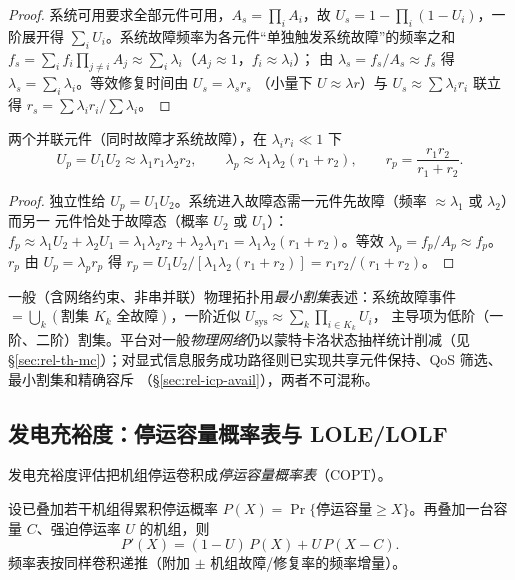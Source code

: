 \begin{proof}
系统可用要求全部元件可用，$A_s=\prod_iA_i$，故 $U_s=1-\prod_i(1-U_i)$，一阶展开得
$\sum_iU_i$。系统故障频率为各元件“单独触发系统故障”的频率之和
$f_s=\sum_i f_i\prod_{j\ne i}A_j\approx\sum_i\lambda_i$（$A_j\approx1$，$f_i\approx\lambda_i$）；
由 $\lambda_s=f_s/A_s\approx f_s$ 得 $\lambda_s=\sum_i\lambda_i$。等效修复时间由 $U_s=\lambda_s r_s$
（小量下 $U\approx\lambda r$）与 $U_s\approx\sum\lambda_ir_i$ 联立得 $r_s=\sum\lambda_ir_i/\sum\lambda_i$。
\end{proof}

\begin{proposition}[双元件并联合并]\label{prop:rel-th-parallel}
两个并联元件（同时故障才系统故障），在 $\lambda_ir_i\ll1$ 下
\begin{equation}
 U_p=U_1U_2\approx\lambda_1r_1\lambda_2r_2,\qquad
 \lambda_p\approx\lambda_1\lambda_2(r_1+r_2),\qquad
 r_p=\frac{r_1r_2}{r_1+r_2}.
 \label{eq:rel-th-parallel}
\end{equation}
\end{proposition}

\begin{proof}
独立性给 $U_p=U_1U_2$。系统进入故障态需一元件先故障（频率 $\approx\lambda_1$ 或 $\lambda_2$）而另一
元件恰处于故障态（概率 $U_2$ 或 $U_1$）：$f_p\approx\lambda_1U_2+\lambda_2U_1
=\lambda_1\lambda_2 r_2+\lambda_2\lambda_1 r_1=\lambda_1\lambda_2(r_1+r_2)$。等效
$\lambda_p=f_p/A_p\approx f_p$。$r_p$ 由 $U_p=\lambda_p r_p$ 得
$r_p=U_1U_2/[\lambda_1\lambda_2(r_1+r_2)]=r_1r_2/(r_1+r_2)$。
\end{proof}

一般（含网络约束、非串并联）物理拓扑用\emph{最小割集}表述：系统故障事件
$=\bigcup_k(\text{割集 }K_k\text{ 全故障})$，一阶近似 $U_{\mathrm{sys}}\approx\sum_k\prod_{i\in K_k}U_i$，
主导项为低阶（一阶、二阶）割集。平台对一般\emph{物理网络}仍以蒙特卡洛状态抽样统计削减（见
\S\ref{sec:rel-th-mc}）；对显式信息服务成功路径则已实现共享元件保持、QoS 筛选、最小割集和精确容斥
（\S\ref{sec:rel-icp-avail}），两者不可混称。

\subsection{发电充裕度：停运容量概率表与 LOLE/LOLF}\label{sec:rel-th-copt}
发电充裕度评估把机组停运卷积成\emph{停运容量概率表}（COPT）。

\begin{proposition}[COPT 递推]\label{prop:rel-th-copt}
设已叠加若干机组得累积停运概率 $P(X)=\Pr\{\text{停运容量}\ge X\}$。再叠加一台容量 $C$、强迫停运率
$U$ 的机组，则
\begin{equation}
 P'(X)=(1-U)\,P(X)+U\,P(X-C).
 \label{eq:rel-th-copt}
\end{equation}
频率表按同样卷积递推（附加 $\pm$ 机组故障/修复率的频率增量）。
\end{proposition}

